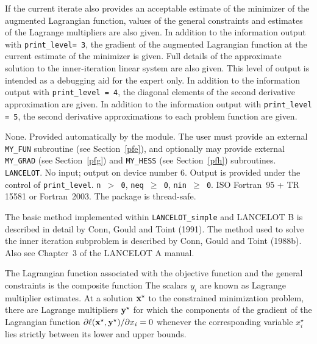 \documentclass{galahad}
\newcommand{\packagename}{LANCELOT\_simple}
\newcommand{\calC}{{\cal C}}
\begin{document}
\begin{description}
                 If the current iterate also provides an acceptable
                 estimate of the minimizer of the augmented Lagrangian
                 function, values of the general constraints and
                 estimates of the Lagrange multipliers are also given.
 In addition to the information output with 
                 {\tt print\_level= 3}, 
                 the gradient of the augmented Lagrangian function at
                 the current estimate of the minimizer is given.
                 Full details of the approximate solution
                 to the inner-iteration linear system are also given.
                 This level of output is intended as a debugging aid
                 for the expert only.
 In addition to the information output with 
                 {\tt print\_level = 4},
                 the diagonal elements of the second derivative
                 approximation are given.
 In addition to the information output with 
                  {\tt print\_level = 5},
                  the second derivative approximations
                  to each problem function are given.
\end{description}


\galgeneral

\galcommon None.
\galworkspace Provided automatically by the module.
\galroutines The user must provide an external {\tt MY\_FUN} subroutine
(see Section~\ref{pfe}), and optionally may provide
external {\tt MY\_GRAD} (see Section~\ref{pfg}) and
{\tt MY\_HESS} (see Section~\ref{pfh}) subroutines. 
\galmodules
{\tt LANCELOT}.
\galio No input; output on device number 6.
    Output is provided under the control of {\tt print\_level}.
\galrestrictions
     {\tt n $>$ 0}, 
     {\tt neq $\geq$ 0},
     {\tt nin $\geq$ 0}.
\galportability ISO Fortran~95 + TR 15581 or Fortran~2003. 
The package is thread-safe.


\galmethod
The basic method implemented within {\tt \packagename} and LANCELOT B is
described in detail by Conn, Gould and Toint (1991).  The method used to solve
the inner iteration subproblem is described by Conn, Gould and Toint
(1988b).  Also see Chapter~3 of the {\sf LANCELOT A} manual.

The Lagrangian function associated with the objective function
and the general constraints is the
composite function \disp{\ell( \bmx, \bmy ) = f(\bmx) + \sum_{i \in
\calC} y_i c_i (\bmx).}  The scalars $y_i$ are known as Lagrange
multiplier estimates.  At a solution ${\mathbf{x}}^{\star}$ to the constrained
minimization problem, there are Lagrange multipliers ${\mathbf{y}}^{\star}$ for
which the components of the gradient of the Lagrangian function
$\partial \ell({\mathbf{x}}^{\star}, {\mathbf{y}}^{\star}) / \partial x_i= 0$ whenever
the corresponding variable $x_i^{\star}$ lies strictly between its lower
and upper bounds. 
\end{document}
